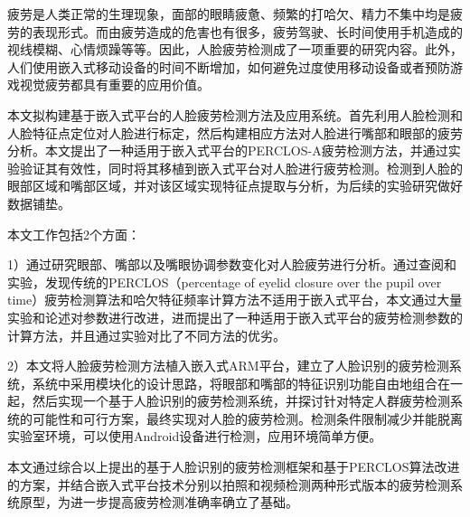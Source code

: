 \begin{cabstract}
疲劳是人类正常的生理现象，面部的眼睛疲惫、频繁的打哈欠、精力不集中均是疲劳的表现形式。而由疲劳造成的危害也有很多，疲劳驾驶、长时间使用手机造成的视线模糊、心情烦躁等等。因此，人脸疲劳检测成了一项重要的研究内容。此外，人们使用嵌入式移动设备的时间不断增加，如何避免过度使用移动设备或者预防游戏视觉疲劳都具有重要的应用价值。

本文拟构建基于嵌入式平台的人脸疲劳检测方法及应用系统。首先利用人脸检测和人脸特征点定位对人脸进行标定，然后构建相应方法对人脸进行嘴部和眼部的疲劳分析。本文提出了一种适用于嵌入式平台的PERCLOS-A疲劳检测方法，并通过实验验证其有效性，同时将其移植到嵌入式平台对人脸进行疲劳检测。检测到人脸的眼部区域和嘴部区域，并对该区域实现特征点提取与分析，为后续的实验研究做好数据铺垫。

本文工作包括2个方面：

1）通过研究眼部、嘴部以及嘴眼协调参数变化对人脸疲劳进行分析。通过查阅和实验，发现传统的PERCLOS（percentage of eyelid closure over the pupil over time）疲劳检测算法和哈欠特征频率计算方法不适用于嵌入式平台，本文通过大量实验和论述对参数进行改进，进而提出了一种适用于嵌入式平台的疲劳检测参数的计算方法，并且通过实验对比了不同方法的优劣。

2）本文将人脸疲劳检测方法植入嵌入式ARM平台，建立了人脸识别的疲劳检测系统，系统中采用模块化的设计思路，将眼部和嘴部的特征识别功能自由地组合在一起，然后实现一个基于人脸识别的疲劳检测系统，并探讨针对特定人群疲劳检测系统的可能性和可行方案，最终实现对人脸的疲劳检测。检测条件限制减少并能脱离实验室环境，可以使用Android设备进行检测，应用环境简单方便。

本文通过综合以上提出的基于人脸识别的疲劳检测框架和基于PERCLOS算法改进的方案，并结合嵌入式平台技术分别以拍照和视频检测两种形式版本的疲劳检测系统原型，为进一步提高疲劳检测准确率确立了基础。




\end{cabstract}


